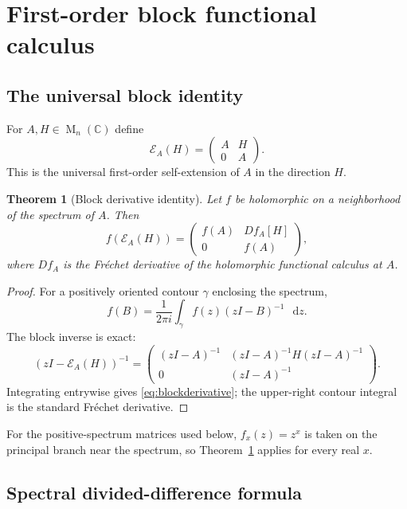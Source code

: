 \documentclass[11pt,oneside]{article}
\newtheorem{theorem}{Theorem}[section]
\theoremstyle{definition}
\theoremstyle{remark}
\newcommand{\C}{\mathbb C}
\newcommand{\Mat}{\operatorname{M}}
\newcommand{\cE}{\mathcal E}
\newcommand{\dd}{\mathop{}\!\mathrm d}
\begin{document}
\section{First-order block functional calculus}
\label{sec:blockfc}

\subsection{The universal block identity}

For $A,H\in\Mat_n(\C)$ define
\begin{equation}
 \cE_A(H)=
 \begin{pmatrix}
 A&H\\0&A
 \end{pmatrix}.
 \label{eq:blockextension}
\end{equation}
This is the universal first-order self-extension of $A$ in the direction $H$.

\begin{theorem}[Block derivative identity]
\label{thm:blockderivative}
Let $f$ be holomorphic on a neighborhood of the spectrum of $A$.  Then
\begin{equation}
 f(\cE_A(H))=
 \begin{pmatrix}
 f(A)&Df_A[H]\\0&f(A)
 \end{pmatrix},
 \label{eq:blockderivative}
\end{equation}
where $Df_A$ is the Fr\'echet derivative of the holomorphic functional calculus at $A$.
\end{theorem}

\begin{proof}
For a positively oriented contour $\gamma$ enclosing the spectrum,
\[
 f(B)=\frac1{2\pi i}\int_\gamma f(z)(zI-B)^{-1}\,\dd z.
\]
The block inverse is exact:
\[
 (zI-\cE_A(H))^{-1}=
 \begin{pmatrix}
 (zI-A)^{-1}&(zI-A)^{-1}H(zI-A)^{-1}\\
 0&(zI-A)^{-1}
 \end{pmatrix}.
\]
Integrating entrywise gives \eqref{eq:blockderivative}; the upper-right contour integral is
the standard Fr\'echet derivative.
\end{proof}

For the positive-spectrum matrices used below, $f_x(z)=z^x$ is taken on the principal branch
near the spectrum, so Theorem~\ref{thm:blockderivative} applies for every real $x$.

\subsection{Spectral divided-difference formula}
\end{document}
